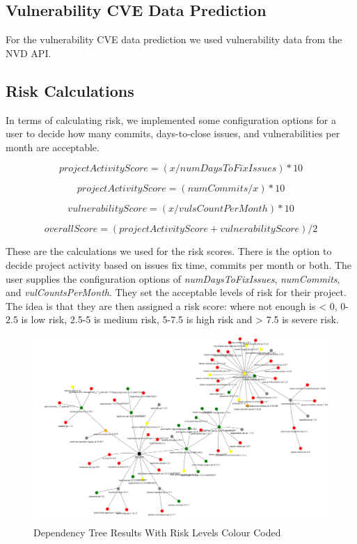 \documentclass[10pt, compsoc, conference]{IEEEtran}
\begin{document}
\subsection{Vulnerability CVE Data Prediction}
For the vulnerability CVE data prediction we used vulnerability data from the NVD API.

\subsection{Risk Calculations}
In terms of calculating risk, we implemented some configuration options for a user to decide how many commits, days-to-close issues, and vulnerabilities per month are acceptable. 

\[ projectActivityScore = ( x / numDaysToFixIssues ) * 10\]

\[ projectActivityScore = ( numCommits / x ) * 10\]

\[vulnerabilityScore = ( x / vulsCountPerMonth ) * 10\]

\[overallScore = ( projectActivityScore + vulnerabilityScore) / 2\]

These are the calculations we used for the risk scores. There is the option to decide project activity based on issues fix time, commits per month or both. The user supplies the configuration options of \textit{numDaysToFixIssues}, \textit{numCommits}, and \textit{vulCountsPerMonth}. They set the acceptable levels of risk for their project. The idea is that they are then assigned a risk score: where not enough is < 0, 0-2.5 is low risk, 2.5-5 is medium risk, 5-7.5 is high risk and > 7.5 is severe risk. 

\begin{figure}
    \centering
    \includegraphics[width=1\linewidth]{image.png}
    \caption{Dependency Tree Results With Risk Levels Colour Coded} 
\end{figure}
\end{document}
